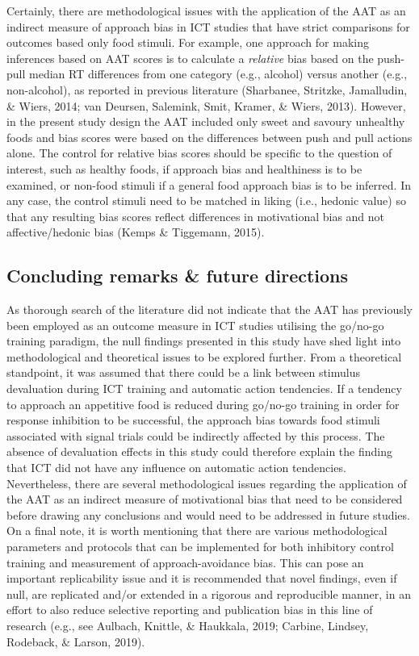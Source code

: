 \documentclass[man,floatsintext]{apa6}
\begin{document}
Certainly, there are methodological issues with the application of the AAT as an indirect measure of approach bias in ICT studies that have strict comparisons for outcomes based only food stimuli. For example, one approach for making inferences based on AAT scores is to calculate a \emph{relative} bias based on the push-pull median RT differences from one category (e.g., alcohol) versus another (e.g., non-alcohol), as reported in previous literature (Sharbanee, Stritzke, Jamalludin, \& Wiers, 2014; van Deursen, Salemink, Smit, Kramer, \& Wiers, 2013). However, in the present study design the AAT included only sweet and savoury unhealthy foods and bias scores were based on the differences between push and pull actions alone. The control for relative bias scores should be specific to the question of interest, such as healthy foods, if approach bias and healthiness is to be examined, or non-food stimuli if a general food approach bias is to be inferred. In any case, the control stimuli need to be matched in liking (i.e., hedonic value) so that any resulting bias scores reflect differences in motivational bias and not affective/hedonic bias (Kemps \& Tiggemann, 2015).

\hypertarget{concluding-remarks-future-directions}{%
\subsection{Concluding remarks \& future directions}\label{concluding-remarks-future-directions}}

\par

As thorough search of the literature did not indicate that the AAT has previously been employed as an outcome measure in ICT studies utilising the go/no-go training paradigm, the null findings presented in this study have shed light into methodological and theoretical issues to be explored further. From a theoretical standpoint, it was assumed that there could be a link between stimulus devaluation during ICT training and automatic action tendencies. If a tendency to approach an appetitive food is reduced during go/no-go training in order for response inhibition to be successful, the approach bias towards food stimuli associated with signal trials could be indirectly affected by this process. The absence of devaluation effects in this study could therefore explain the finding that ICT did not have any influence on automatic action tendencies. Nevertheless, there are several methodological issues regarding the application of the AAT as an indirect measure of motivational bias that need to be considered before drawing any conclusions and would need to be addressed in future studies. On a final note, it is worth mentioning that there are various methodological parameters and protocols that can be implemented for both inhibitory control training and measurement of approach-avoidance bias. This can pose an important replicability issue and it is recommended that novel findings, even if null, are replicated and/or extended in a rigorous and reproducible manner, in an effort to also reduce selective reporting and publication bias in this line of research (e.g., see Aulbach, Knittle, \& Haukkala, 2019; Carbine, Lindsey, Rodeback, \& Larson, 2019).
\end{document}
